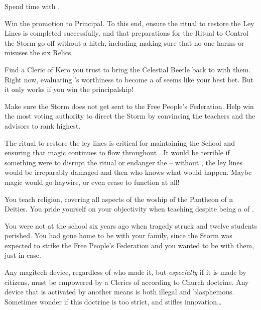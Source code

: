 \documentclass[char]{GL2020}
\begin{document}
\begin{itemz}
	\item Spend time with \cJuniorStatesman{}.
	\item Win the promotion to Principal. To this end, ensure the ritual to restore the Ley Lines is completed successfully, and that preparations for the Ritual to Control the Storm go off without a hitch, including making sure that no one harms or misuses the six Relics.
	\item Find a Cleric of Kero you trust to bring the Celestial Beetle back to \pTech{} with them. Right now, evaluating \cHeadScientist{}'s worthiness to become a \cHeadScientist{\clergy} of \cTechGod{} seems like your best bet. But it only works if you win the principalship!
	\item Make sure the Storm does not get sent to the Free People's Federation. Help \cTechStar{} win the most voting authority to direct the Storm by convincing the \pShip{} teachers and the \pTech{} advisors to rank \cTechStar{\them} highest.
\end{itemz}

\begin{itemz}[Notes]
	\item The ritual to restore the ley lines is critical for maintaining the School and ensuring that magic continues to flow throughout \pEarth{}.  It would be terrible if something were to disrupt the ritual or endanger the \pSc{} – without \pSc{}, the ley lines would be irreparably damaged and then who knows what would happen. Maybe magic would go haywire, or even cease to function at all!
	\item You teach religion, covering all aspects of the woship of the Pantheon of \pEarth{}n Deities. You pride yourself on your objectivity when teaching despite being a \cBeetle{\cleric} of \cTechGod{}.
	\item You were not at the school six years ago when tragedy struck and twelve students perished. You had gone home to be with your family, since the Storm was expected to strike the Free People's Federation and you wanted to be with them, just in case.
	\item  Any magitech device, regardless of who made it, but \emph{especially} if it is made by \pTech{} citizens, must be empowered by a Clerics of \cTechGod{} according to Church doctrine. Any device that is activated by another means is both illegal and blasphemous. Sometimes wonder if this doctrine is too strict, and stifles innovation\ldots{}
\end{itemz}
\end{document}
